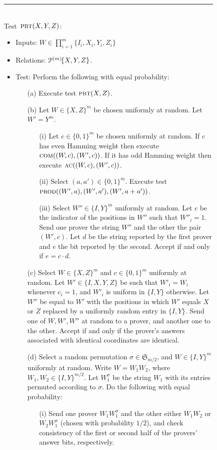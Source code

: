 \begin{figure}[H]
\rule[1ex]{\textwidth}{0.5pt}\\
\justifying
Test~$\textsc{pbt}(X,Y,Z)$: 
\begin{itemize}
\item Inputs: $W\in\prod_{i=1}^m\{I_i,X_i,Y_i,Z_i\}$
\item Relations: $\mathcal{P}^{(m)}\!\{X,Y,Z\}$.  
\item Test: Perform the following with equal probability: 
\begin{enumerate}
\item[(a)] Execute test $\textsc{pbt}(X,Z)$. 
\item[(b)] Let $W\in\{X,Z\}^m$ be chosen uniformly at random. Let $W'=Y^m$. 
\begin{enumerate}
\item[(i)] Let $c\in\{0,1\}^m$ be chosen uniformly at random. If $c$ has even Hamming weight then execute $\textsc{com}((W,c),(W',c))$. If it has odd Hamming weight then execute $\textsc{ac}((W,c),(W',c))$. 
\item[(ii)]  Select $(a,a')\in\{0,1\}^m$. Execute test $\textsc{prod}((W',a),(W',a'),(W',a+a'))$. 
\item[(iii)] Select $W''\in\{I,Y\}^m$ uniformly at random. Let $c$ be the indicator of the positions in $W''$ such that $W''_i=1$. Send one prover the string $W''$ and the other the pair $(W',c)$. Let $d$ be the string reported by the first prover and $e$ the bit reported by the second. Accept if and only if $e=c\cdot d$. 
\end{enumerate}
\item[(c)] Select $W\in\{X,Z\}^m$ and $c\in\{0,1\}^m$ uniformly at random. Let $W'\in\{I,X,Y,Z\}$ be such that $W'_i=W_i$ whenever $c_i=1$, and $W'_i$ is uniform in $\{I,Y\}$ otherwise. Let $W''$ be equal to $W'$ with the positions in which $W'$ equals $X$ or $Z$ replaced by a uniformly random entry in $\{I,Y\}$. Send one of $W,W',W''$ at random to a prover, and another one to the other. Accept if and only if the prover's answers associated with identical coordinates are identical. 
\item[(d)] Select a random permutation  $\sigma \in \mathfrak{S}_{m/2}$, and $W\in  \{I,Y\}^m$ uniformly at random. Write $W=W_1 W_2$, where $W_1,W_2\in \{I,Y\}^{m/2}$. Let $W_1^\sigma$ be the string $W_1$ with its entries permuted according to $\sigma$. Do the following with equal probability: 
\begin{enumerate}
\item[(i)] Send one prover $W_1 W_1^\sigma$ and the other either $W_1 W_2$ or $W_2W_1^\sigma$ (chosen with probability $1/2$), and check consistency of the first or second half of the provers' answer bits, respectively.

\end{enumerate}
\end{enumerate}
\end{itemize}
\end{figure}
